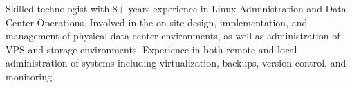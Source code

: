 
\begin{cvparagraph}

	{Skilled technologist with 8+ years experience in Linux Administration
and Data Center Operations. Involved in the on-site design,
implementation, and management of physical data center
environments, as well as administration of VPS and storage
environments. Experience in both remote and local administration of
systems including virtualization, backups, version control, and
monitoring.}
	
\end{cvparagraph}
